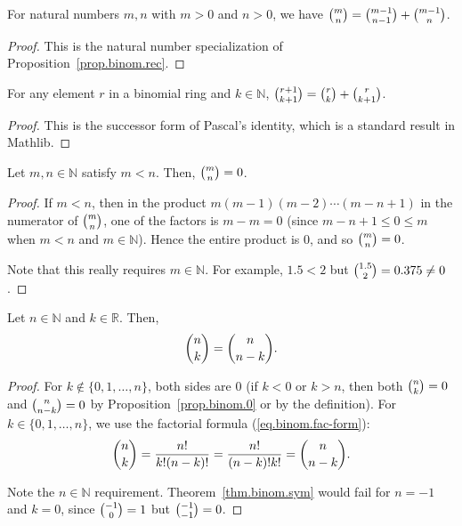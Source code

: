 \begin{lemma}
\label{lem.binom.pascal_nat}
\leanhelper
\leanok
For natural numbers $m, n$ with $m > 0$ and $n > 0$, we have
$\dbinom{m}{n}=\dbinom{m-1}{n-1}+\dbinom{m-1}{n}$.
\end{lemma}

\begin{proof}
\leanok
This is the natural number specialization of Proposition~\ref{prop.binom.rec}.
\end{proof}

\begin{lemma}
\label{lem.binom.pascal_succ}
\leanhelper
\leanok
For any element $r$ in a binomial ring and $k \in \mathbb{N}$,
$\dbinom{r+1}{k+1} = \dbinom{r}{k} + \dbinom{r}{k+1}$.
\end{lemma}

\begin{proof}
\leanok
This is the successor form of Pascal's identity,
which is a standard result in Mathlib.
\end{proof}

\begin{proposition}
\label{prop.binom.0}
\leantarget
\leanok
Let $m,n\in\mathbb{N}$ satisfy $m<n$. Then, $\dbinom{m}{n}=0$.
\end{proposition}

\begin{proof}
\leanok
If $m < n$, then in the product $m(m-1)(m-2)\cdots(m-n+1)$ in the numerator of $\dbinom{m}{n}$,
one of the factors is $m - m = 0$ (since $m - n + 1 \leq 0 \leq m$ when $m < n$ and $m \in \mathbb{N}$).
Hence the entire product is $0$, and so $\dbinom{m}{n} = 0$.

Note that this really requires $m\in\mathbb{N}$. For
example, $1.5<2$ but $\dbinom{1.5}{2}=0.375\neq0$.
\end{proof}

\begin{theorem}
\label{thm.binom.sym}
\leantarget
\leanok
Let $n\in\mathbb{N}$ and $k\in\mathbb{R}$. Then,%
\[
\dbinom{n}{k}=\dbinom{n}{n-k}.
\]
\end{theorem}

\begin{proof}
\leanok
For $k \notin \{0, 1, \ldots, n\}$, both sides are $0$
(if $k < 0$ or $k > n$, then both $\dbinom{n}{k} = 0$ and $\dbinom{n}{n-k} = 0$
by Proposition~\ref{prop.binom.0} or by the definition).
For $k \in \{0, 1, \ldots, n\}$, we use the factorial formula (\ref{eq.binom.fac-form}):
\[
\dbinom{n}{k} = \frac{n!}{k!(n-k)!} = \frac{n!}{(n-k)!k!} = \dbinom{n}{n-k}.
\]

Note the $n\in\mathbb{N}$ requirement. Theorem~\ref{thm.binom.sym} would fail for $n=-1$ and $k=0$,
since $\dbinom{-1}{0} = 1$ but $\dbinom{-1}{-1} = 0$.
\end{proof}


